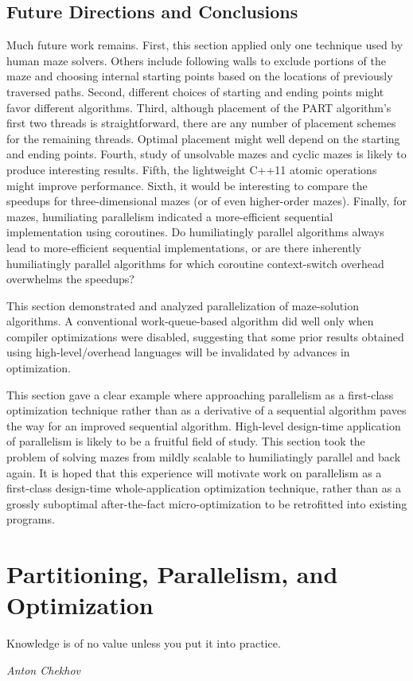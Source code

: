 \subsection{Future Directions and Conclusions}
\label{sec:SMPdesign:Future Directions and Conclusions}

Much future work remains.
First, this section applied only one technique used by human maze solvers.
Others include following walls to exclude portions of the maze
and choosing internal starting points based on the
locations of previously traversed paths.
Second, different choices of
starting and ending points might favor different algorithms.
Third, although placement of the PART algorithm's
first two threads is straightforward, there are any number of
placement schemes for the remaining threads.
Optimal placement might well depend on the starting and ending points.
Fourth, study of unsolvable mazes and cyclic mazes
is likely to produce interesting results.
Fifth, the lightweight C++11 atomic operations might improve performance.
Sixth, it would be interesting to compare the speedups for
three-dimensional mazes (or of even higher-order mazes).
Finally, for mazes, humiliating parallelism indicated a
more-efficient sequential implementation using coroutines.
Do humiliatingly parallel algorithms always lead to more-efficient
sequential implementations, or are there inherently humiliatingly parallel
algorithms for which coroutine context-switch overhead overwhelms the
speedups?

This section demonstrated and analyzed parallelization of maze-solution
algorithms.
A conventional work-queue-based algorithm did well only when compiler
optimizations were disabled, suggesting that some prior results obtained
using high-level/overhead languages will be invalidated
by advances in optimization.

This section gave a clear example where approaching parallelism
as a first-class optimization technique rather than as a derivative of a
sequential algorithm paves the way for an improved sequential algorithm.
High-level design-time application of parallelism is likely to be a
fruitful field of study.
This section took the problem of solving mazes from mildly scalable
to humiliatingly parallel and back again.
It is hoped that this experience will motivate work on parallelism
as a first-class design-time whole-application optimization technique,
rather than as a grossly suboptimal after-the-fact micro-optimization
to be retrofitted into existing programs.

\section{Partitioning, Parallelism, and Optimization}
\label{sec:SMPdesign:Partitioning, Parallelism, and Optimization}
%
\epigraph{Knowledge is of no value unless you put it into practice.}
	 {\emph{Anton Chekhov}}


